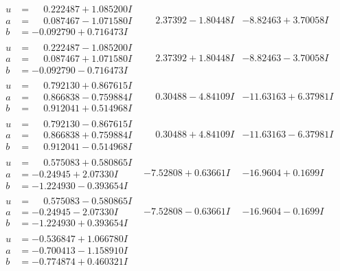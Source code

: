 \documentclass[1p]{elsarticle_modified}
\theoremstyle{definition}
\begin{document}
$$\begin{array}{c|c|c}
\begin{aligned}
u &= \phantom{-}0.222487 + 1.085200 I \\
a &= \phantom{-}0.087467 - 1.071580 I \\
b &= -0.092790 + 0.716473 I\end{aligned}
 & \phantom{-}2.37392 - 1.80448 I & -8.82463 + 3.70058 I \\ \hline\begin{aligned}
u &= \phantom{-}0.222487 - 1.085200 I \\
a &= \phantom{-}0.087467 + 1.071580 I \\
b &= -0.092790 - 0.716473 I\end{aligned}
 & \phantom{-}2.37392 + 1.80448 I & -8.82463 - 3.70058 I \\ \hline\begin{aligned}
u &= \phantom{-}0.792130 + 0.867615 I \\
a &= \phantom{-}0.866838 - 0.759884 I \\
b &= \phantom{-}0.912041 + 0.514968 I\end{aligned}
 & \phantom{-}0.30488 - 4.84109 I & -11.63163 + 6.37981 I \\ \hline\begin{aligned}
u &= \phantom{-}0.792130 - 0.867615 I \\
a &= \phantom{-}0.866838 + 0.759884 I \\
b &= \phantom{-}0.912041 - 0.514968 I\end{aligned}
 & \phantom{-}0.30488 + 4.84109 I & -11.63163 - 6.37981 I \\ \hline\begin{aligned}
u &= \phantom{-}0.575083 + 0.580865 I \\
a &= -0.24945 + 2.07330 I \\
b &= -1.224930 - 0.393654 I\end{aligned}
 & -7.52808 + 0.63661 I & -16.9604 + 0.1699 I \\ \hline\begin{aligned}
u &= \phantom{-}0.575083 - 0.580865 I \\
a &= -0.24945 - 2.07330 I \\
b &= -1.224930 + 0.393654 I\end{aligned}
 & -7.52808 - 0.63661 I & -16.9604 - 0.1699 I \\ \hline\begin{aligned}
u &= -0.536847 + 1.066780 I \\
a &= -0.700413 - 1.158910 I \\
b &= -0.774874 + 0.460321 I\end{aligned}

\end{array}$$
\end{document}
